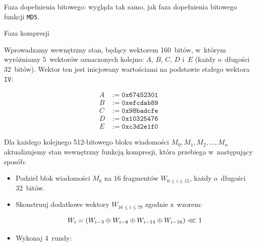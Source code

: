 \begin{myenumerate}

    \item Faza dopełnienia bitowego: wygląda tak samo, jak faza dopełnienia
    bitowego funkcji \texttt{MD5}.

    \item Faza kompresji

    \begin{myenumerate}

        \item Wprowadzamy wewnętrzny stan, będący wektorem 160~bitów, w~którym
        wyróżniamy 5~wektorów oznaczonych kolejno: $A$, $B$, $C$, $D$ i~$E$
        (każdy o~długości 32~bitów). Wektor ten jest inicjowany wartościami na
        podstawie stałego wektora $\mathtt{IV}$:

        \[
            \begin{aligned}
                A &:= \mathtt{0x67452301} \\
                B &:= \mathtt{0xefcdab89} \\
                C &:= \mathtt{0x98badcfe} \\
                D &:= \mathtt{0x10325476} \\
                E &:= \mathtt{0xc3d2e1f0}
            \end{aligned}
        \]

        \item Dla każdego kolejnego 512-bitowego bloku wiadomości \break $M_0,
        M_1, M_2, \ldots, M_n$ aktualizujemy stan wewnętrzny funkcją kompresji,
        która przebiega w~następujący sposób:

        \begin{itemize}

            \item Podziel blok wiadomości $M_k$ na $16$ fragmentów $W_{0 \leq i
            \leq 15}$, każdy o~długości 32~bitów.

            \item Skonstruuj dodatkowe wektory $W_{16 \leq i \leq 79}$ zgodnie
            z~wzorem:

            $$
                W_i = (W_{i-3} \oplus W_{i-8} \oplus W_{i-14} \oplus W_{i-16})
                \llless 1
            $$

            \item Wykonaj 4~rundy:

            \begin{itemize}


\end{itemize}
\end{itemize}
\end{myenumerate}
\end{myenumerate}
